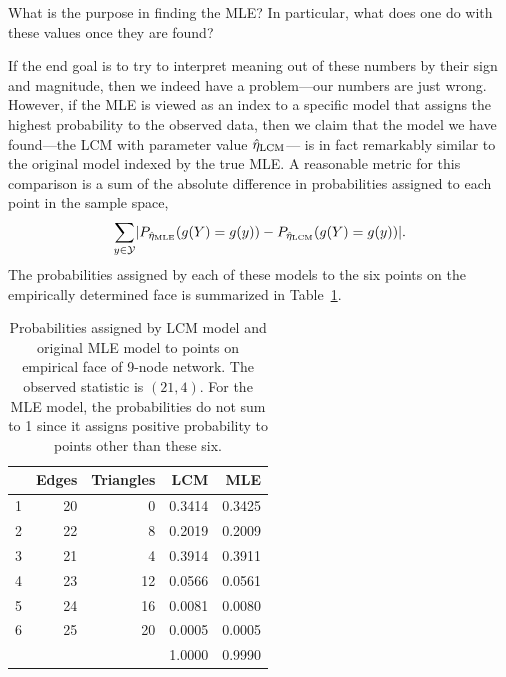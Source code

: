 What is the purpose in finding the MLE?  In particular, what does one do with these values once they are found?

If the end goal is to try to interpret meaning out of these numbers by their sign and  
magnitude, then we indeed have a problem---our numbers are just wrong.  
However, if the MLE is viewed as an 
index to a specific model that assigns the highest probability to the observed data,
then we claim that the model we have found---the LCM with parameter value $\hat{\eta}_{\textrm{LCM}}$---
is in fact remarkably similar to the original model indexed by the true MLE.  A 
reasonable metric for this comparison is a sum of the absolute difference in 
probabilities assigned to each point in the sample space,
\begin{align*}
	\sum_{y \in {\mathcal Y}} \lvert  P_{\hat{\eta}_{\textrm{MLE}}}(g(Y) =g(y) ) -  P_{\hat{\eta}_{\textrm{LCM}}}(g(Y) = g(y))   \rvert.
\end{align*}
The probabilities assigned by each of these models to the six points on the 
empirically determined face is summarized in Table~\ref{T:LCMvsMLE}.

\begin{table}[h!] 
\begin{center}
\caption[Comparison of probabilities assigned by LCM model and 
original MLE model to empirical face of 9-node network]
{Probabilities assigned by LCM model and original MLE model 
to points on empirical face of 9-node network.  The observed statistic is 
$(21,4)$.  For the MLE model, the probabilities do not sum to 1 since it assigns 
positive probability to points other than these six.}

\begin{tabular}{rrrrr}
\\  \hline
 & Edges & Triangles & LCM & MLE \\ 
  \hline
1 & 20 & 0 & 0.3414 & 0.3425 \\ 
  2 & 22 & 8 & 0.2019 & 0.2009 \\ 
  3 & 21 & 4 & 0.3914 & 0.3911 \\ 
  4 & 23 & 12 & 0.0566 & 0.0561 \\ 
  5 & 24 & 16 & 0.0081 & 0.0080 \\ 
  6 & 25 & 20 & 0.0005 & 0.0005 \\ 
   \hline
   &  &  & 1.0000 & 0.9990 \\ 
\end{tabular}\label{T:LCMvsMLE}
\end{center}
\end{table}

